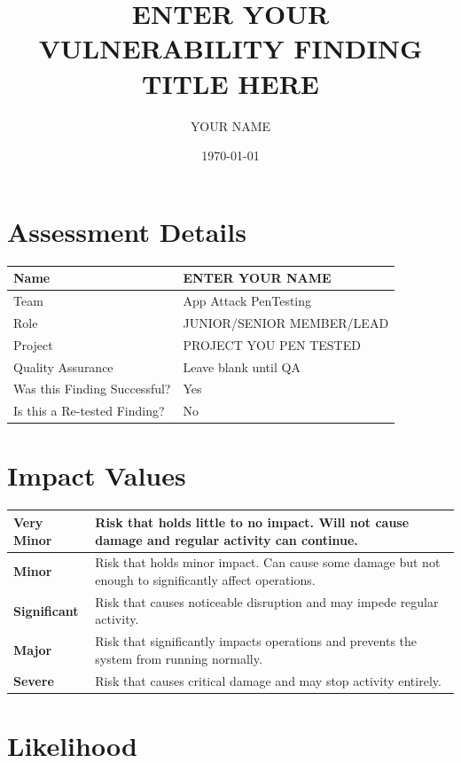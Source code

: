 \documentclass[12pt]{article}
\title{ENTER YOUR VULNERABILITY FINDING TITLE HERE}
\author{YOUR NAME}
\date{\today}
\begin{document}
\maketitle

\section*{Assessment Details}

\begin{tabular}{|p{5cm}|p{7.5cm}|}
\hline
Name & ENTER YOUR NAME \\ \hline
Team & App Attack PenTesting \\ \hline
Role & JUNIOR/SENIOR MEMBER/LEAD \\ \hline
Project & PROJECT YOU PEN TESTED \\ \hline
Quality Assurance & Leave blank until QA \\ \hline
Was this Finding Successful? & Yes \\ \hline
Is this a Re-tested Finding? & No \\ \hline
\end{tabular}

\section*{Impact Values}

\begin{longtable}{|p{3cm}|p{12cm}|}
\hline
\textbf{\textcolor{veryminor}{Very Minor}} & Risk that holds little to no impact. Will not cause damage and regular activity can continue. \\ \hline
\textbf{\textcolor{minor}{Minor}} & \textcolor{minor}{Risk that holds minor impact. Can cause some damage but not enough to significantly affect operations.} \\ \hline
\textbf{\textcolor{significant}{Significant}} & Risk that causes noticeable disruption and may impede regular activity. \\ \hline
\textbf{\textcolor{major}{Major}} & Risk that significantly impacts operations and prevents the system from running normally. \\ \hline
\textbf{\textcolor{severe}{Severe}} & Risk that causes critical damage and may stop activity entirely. \\ \hline
\end{longtable}

\section*{Likelihood}
\end{document}
